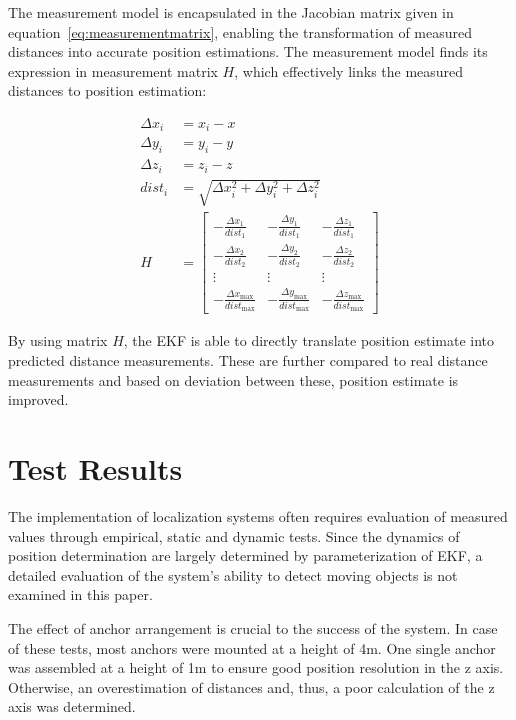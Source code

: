 \documentclass[conference, a4paper]{IEEEtran}
\begin{document}
The measurement model is encapsulated in the Jacobian matrix given in equation~\ref{eq:measurementmatrix},
enabling the transformation of measured distances into accurate position estimations. 
The measurement model finds its expression in measurement matrix $H$, 
which effectively links the measured distances to position estimation:

\begin{equation}
	\begin{aligned}
		\Delta x_i &= x_i - x \\
		\Delta y_i &= y_i - y \\
		\Delta z_i &= z_i - z \\
		dist_i &= \sqrt{{\Delta x_i^2 + \Delta y_i^2 + \Delta z_i^2}} \\
		H &= \begin{bmatrix}
			-\frac{{\Delta x_1}}{{dist_1}} & -\frac{{\Delta y_1}}{{dist_1}} & -\frac{{\Delta z_1}}{{dist_1}} \\
			-\frac{{\Delta x_2}}{{dist_2}} & -\frac{{\Delta y_2}}{{dist_2}} & -\frac{{\Delta z_2}}{{dist_2}} \\
			\vdots & \vdots & \vdots \\
			-\frac{{\Delta x_{\text{max}}}}{{dist_{\text{max}}}} & -\frac{{\Delta y_{\text{max}}}}{{dist_{\text{max}}}} & -\frac{{\Delta z_{\text{max}}}}{{dist_{\text{max}}}}
		\end{bmatrix}
	\end{aligned}
	\label{eq:measurementmatrix}
\end{equation}

By using matrix $H$, the \ac{EKF} is able to directly translate position estimate into predicted distance measurements.
These are further compared to real distance measurements and based on deviation between these, position estimate is improved.


\section{Test Results}\label{section:tests}
The implementation of localization systems often requires evaluation of measured values through empirical,
static and dynamic tests.
Since the dynamics of position determination are largely determined by parameterization of \ac{EKF},
a detailed evaluation of the system's ability to detect moving objects is not examined in this paper.

The effect of anchor arrangement is crucial to the success of the system.
In case of these tests, most anchors were mounted at a height of 4m.
One single anchor was assembled at a height of 1m to ensure good position resolution in the z axis.
Otherwise, an overestimation of distances and, thus, a poor calculation of the z axis was determined.
\end{document}
